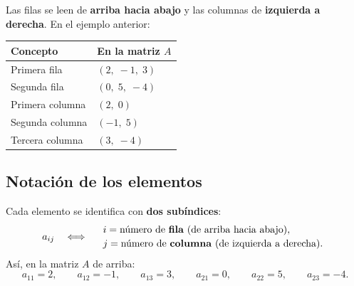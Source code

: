 \documentclass[12pt, letterpaper]{article}
\begin{document}
Las filas se leen de \textbf{arriba hacia abajo} y las columnas de
\textbf{izquierda a derecha}. En el ejemplo anterior:

\begin{center}
\small
\begin{tabular}{@{}ll@{}}
  \toprule
  \textbf{Concepto} & \textbf{En la matriz $A$} \\
  \midrule
  Primera fila    & $(2,\;-1,\;3)$ \\
  Segunda fila    & $(0,\;5,\;-4)$ \\
  Primera columna & $(2,\;0)$ \\
  Segunda columna & $(-1,\;5)$ \\
  Tercera columna & $(3,\;-4)$ \\
  \bottomrule
\end{tabular}
\end{center}

\begin{center}
\end{center}

\subsection*{Notación de los elementos}

Cada elemento se identifica con \textbf{dos subíndices}:
\[
  a_{ij} \quad\Longleftrightarrow\quad
  \begin{array}{l}
    i=\text{número de \textbf{fila} (de arriba hacia abajo)},\\[2pt]
    j=\text{número de \textbf{columna} (de izquierda a derecha)}.
  \end{array}
\]
Así, en la matriz $A$ de arriba:
\[
  a_{11}=2,\qquad a_{12}=-1,\qquad a_{13}=3,\qquad
  a_{21}=0,\qquad a_{22}=5,\qquad a_{23}=-4.
\]
\end{document}
